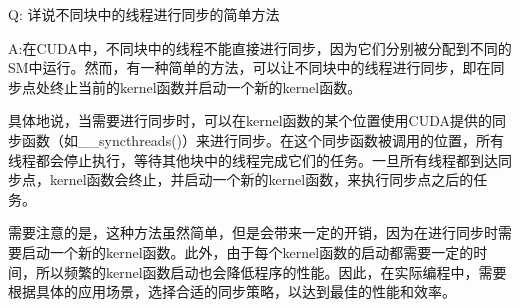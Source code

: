 \documentclass[11pt]{ctexart}
\begin{document}
Q: 详说不同块中的线程进行同步的简单方法

A:在CUDA中，不同块中的线程不能直接进行同步，因为它们分别被分配到不同的SM中运行。然而，有一种简单的方法，可以让不同块中的线程进行同步，即在同步点处终止当前的kernel函数并启动一个新的kernel函数。

具体地说，当需要进行同步时，可以在kernel函数的某个位置使用CUDA提供的同步函数（如\_\_syncthreads()）来进行同步。在这个同步函数被调用的位置，所有线程都会停止执行，等待其他块中的线程完成它们的任务。一旦所有线程都到达同步点，kernel函数会终止，并启动一个新的kernel函数，来执行同步点之后的任务。

需要注意的是，这种方法虽然简单，但是会带来一定的开销，因为在进行同步时需要启动一个新的kernel函数。此外，由于每个kernel函数的启动都需要一定的时间，所以频繁的kernel函数启动也会降低程序的性能。因此，在实际编程中，需要根据具体的应用场景，选择合适的同步策略，以达到最佳的性能和效率。
\end{document}
